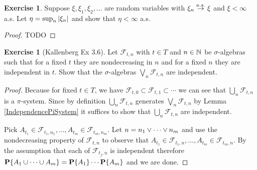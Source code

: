 \documentclass{amsart}
\theoremstyle{remark}
\theoremstyle{definition}
\newtheorem{ex}[thm]{Exercise}
\begin{document}
\begin{ex}Suppose $\xi, \xi_1, \xi_2, \dots$ are random variables with
  $\xi_n \overset{a.s.}\to \xi$ and $\xi < \infty$ a.s.  Let $\eta = \sup_n
  \left \vert \xi_n \right \vert$ and show that $\eta < \infty$ a.s.
\end{ex}
\begin{proof}
TODO
\end{proof}

\begin{ex}[Kallenberg Ex 3.6]Let $\mathcal{F}_{t,n}$ with $t \in T$ and $n \in \mathbb{N}$
  be $\sigma$-algebras such that for a fixed $t$ they are
  nondecreasing in $n$ and for a fixed $n$ they are independent in
  $t$.  Show that the $\sigma$-algebras $\bigvee_n \mathcal{F}_{t,n}$
  are independent.
\end{ex}
\begin{proof}
Because for fixed $t \in T$, we have $\mathcal{F}_{t,0} \subset
\mathcal{F}_{t,1} \subset \cdots$ we can see that $\bigcup_n
\mathcal{F}_{t,n}$ is a $\pi$-system.  Since by definition $\bigcup_n
\mathcal{F}_{t,n}$ generates $\bigvee_n
\mathcal{F}_{t,n}$ by Lemma \ref{IndependencePiSystem} it suffices to
show that $\bigcup_n \mathcal{F}_{t,n}$ are independent.

Pick $A_{t_1} \in \mathcal{F}_{t_1,n_1}, \dotsc, A_{t_m} \in
\mathcal{F}_{t_m,n_m}$. Let $n = n_1 \vee \dotsb \vee n_m$ and use
the nondecreasing property of $\mathcal{F}_{t,n}$ to observe that $A_{t_1} \in \mathcal{F}_{t_1,n}, \dotsc, A_{t_m} \in
\mathcal{F}_{t_m,n}$.  By the assumption that each of $\mathcal{F}_{t_j,n}$ is independent
therefore $\textbf{P}\{A_1 \cup \dotsb \cup A_m\} = \textbf{P}\{A_1\}
\dotsm \textbf{P}\{A_m\}$ and we are done.
\end{proof}
\end{document}
